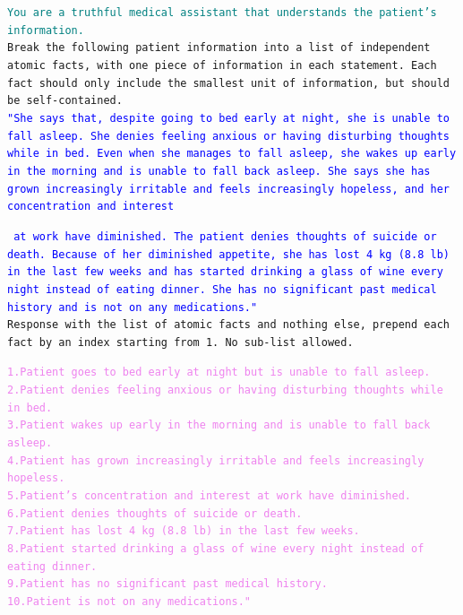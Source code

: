 \begin{tcolorbox}[title={Atomic fact decomposition Prompt}, colframe=gray]
\small\texttt{\textcolor{teal}{You are a truthful medical assistant that understands the patient's information.}\vspace{4mm}\\
Break the following patient information into a list of independent atomic facts, with one piece of information in each statement. Each fact should only include the smallest unit of information, but should be self-contained.\\
        \textcolor{blue}{"She says that, despite going to bed early at night, she is unable to fall asleep. She denies feeling anxious or having disturbing thoughts while in bed. Even when she manages to fall asleep, she wakes up early in the morning and is unable to fall back asleep. She says she has grown increasingly irritable and feels increasingly hopeless, and her concentration and interest}}\normalsize
\end{tcolorbox}

\begin{tcolorbox}[title={Atomic fact decomposition Prompt (cont'd)}, colframe=gray]
\small\texttt{
        \textcolor{blue}{at work have diminished. The patient denies thoughts of suicide or death. Because of her diminished appetite, she has lost 4 kg (8.8 lb) in the last few weeks and has started drinking a glass of wine every night instead of eating dinner. She has no significant past medical history and is not on any medications."}\vspace{4mm}\\
Response with the list of atomic facts and nothing else, prepend each fact by an index starting from 1. No sub-list allowed.}\normalsize
\end{tcolorbox}


\begin{tcolorbox}[title={Example LLM Output}, colframe=gray]
\small\texttt{\textcolor{violet}{1.Patient goes to bed early at night but is unable to fall asleep.\\
        2.Patient denies feeling anxious or having disturbing thoughts while in bed.\\
        3.Patient wakes up early in the morning and is unable to fall back asleep.\\
        4.Patient has grown increasingly irritable and feels increasingly hopeless.\\
        5.Patient's concentration and interest at work have diminished.\\
        6.Patient denies thoughts of suicide or death.\\
        7.Patient has lost 4 kg (8.8 lb) in the last few weeks.\\
        8.Patient started drinking a glass of wine every night instead of eating dinner.\\
        9.Patient has no significant past medical history.\\
        10.Patient is not on any medications."}}\normalsize
\end{tcolorbox}


